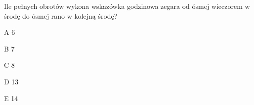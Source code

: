 \begin{tresc}
Ile pełnych obrotów wykona wskazówka godzinowa zegara od ósmej wieczorem w środę do ósmej rano w kolejną środę?
\end{tresc}
\begin{wariant}{A} 6 \end{wariant}
\begin{wariant}{B} 7 \end{wariant}
\begin{wariant}{C} 8 \end{wariant}
\begin{wariant}{D} 13 \end{wariant}
\begin{wariant}{E} 14 \end{wariant}
